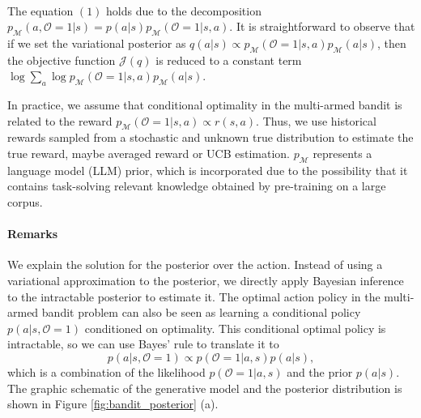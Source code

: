 \documentclass{article} %
\theoremstyle{plain}
\theoremstyle{definition}
\theoremstyle{remark}
\newcommand{\fig}{{Figure }}
\newcommand{\yanxue}[1]{{ \color{orange}[yanxue: #1]}}
\begin{document}
{\begin{equation}
\begin{aligned}
\end{aligned}
\end{equation}
The equation $(1)$ holds due to the decomposition $p_{\mathcal{M}}(a,\mathcal{O}=1|s)=p(a|s)p_{\mathcal{M}}(\mathcal{O}=1|s,a)$. It is straightforward to observe that if we set the variational posterior as $q(a|s)\propto p_{\mathcal{M}}(\mathcal{O}=1|s,a)p_\mathcal{M}(a|s)$, then the objective function $\mathcal{J}(q)$ is reduced to a constant term $\log \sum_a \log p_\mathcal{M}(\mathcal{O}=1|s,a)p_\mathcal{M}(a|s)$.

In practice, we assume that conditional optimality in the multi-armed bandit is related to the reward $p_\mathcal{M}(\mathcal{O}=1|s,a)\propto r(s,a)$. Thus, we use historical rewards sampled from a stochastic and unknown true distribution to estimate the true reward, maybe averaged reward or UCB estimation. $p_\mathcal{M}$ represents a language model (LLM) prior, which is incorporated due to the possibility that it contains task-solving relevant knowledge obtained by pre-training on a large corpus.
\paragraph{Remarks}We explain the solution for the posterior over the action. Instead of using a variational approximation to the posterior, we directly apply Bayesian inference to the intractable posterior to estimate it. The optimal action policy in the multi-armed bandit problem can also be seen as learning a conditional policy $p(a|s, \mathcal{O}=1)$ conditioned on optimality. This conditional optimal policy is intractable, so we can use Bayes' rule to translate it to $$p(a|s, \mathcal{O}=1) \propto p(\mathcal{O}=1|a,s)p(a|s),$$ which is a combination of the likelihood $p(\mathcal{O}=1|a,s)$ and the prior $p(a|s)$. The graphic schematic of the generative model and the posterior distribution is shown in \fig \ref{fig:bandit_posterior} (a).

}
\end{document}
